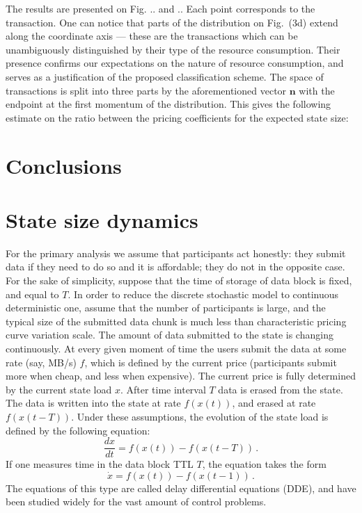 \documentclass[]{llncs}   %
\newcommand{\authnote}[2]{\marginpar{\parbox{\marginparwidth}{\tiny %
  \textsf{#1 {\textcolor{blue}{notes: #2}}}}}%
  \textcolor{blue}{\textbf{\dag}}}
\newcommand{\authnote}[2]{
  \textsf{#1\textcolor{blue}{ #2}}}
\newcommand{\authnote}[2]{}
\newcommand{\vk}[1]{{\authnote{\textcolor{red}{V:}}{#1}}}
\begin{document}
\vk{block range; justify representativeness}

The results are presented on Fig. .. and .. Each point corresponds to the
transaction.  One can notice that parts of the distribution on Fig.~(3d) extend
along the coordinate axis --- these are the transactions which can be
unambiguously distinguished by their type of the resource consumption. Their
presence confirms our expectations on the nature of resource consumption, and
serves as a justification of the proposed classification scheme. The space of
transactions is split into three parts by the aforementioned vector $\mathbf{n}$
with the endpoint at the first momentum of the distribution. This gives the
following estimate on the ratio between the pricing coefficients for the
expected state size:

\section{Conclusions}




\appendix

\section{State size dynamics}
\label{apx:statesize}
For the primary analysis we assume that participants act honestly: they submit
data if they need to do so and it is affordable; they do not in the opposite
case. For the sake of simplicity, suppose that the time of storage of data
block is fixed, and equal to $T$. In order to reduce the discrete stochastic
model to continuous deterministic one, assume that the number of participants
is large, and the typical size of the submitted data chunk is much less than
characteristic pricing curve variation scale. The amount of data submitted to
the state is changing continuously. At every given moment of time the users
submit the data at some rate (say, MB/s) $f$, which is defined by the current
price (participants submit more when cheap, and less when expensive). The
current price is fully determined by the current state load $x$. After time
interval $T$ data is erased from the state. The data is written into the state
at rate $f(x(t))$, and erased at rate $f(x(t-T))$. Under these assumptions,
the evolution of the state load is defined by the following equation:
\begin{equation}
    \frac{dx}{dt} = f(x(t))-f(x(t-T))\,.
    \label{eq:dde0}
\end{equation}
If one measures time in the data block TTL $T$, the equation takes the form
\begin{equation}
    \dot{x} = f(x(t))-f(x(t-1))\,.
    \label{eq:dde1}
\end{equation}
The equations of this type are called delay differential equations (DDE), and have
been studied widely for the vast amount of control problems.
\end{document}
